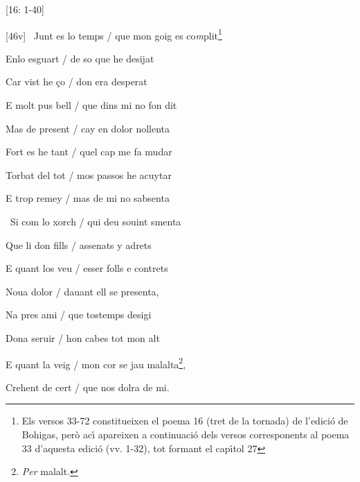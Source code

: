\documentclass[12pt]{article}
\begin{document}
\begin{estrofaBuida}


\end{estrofaBuida}


\begin{estrofaExtra}%




\begin{Versos}

[16: 1-40]

\end{Versos}


\end{estrofaExtra}


\begin{estrofa}

 [46v] \textparagraph\  Junt es lo temps / que mon goig es
co\textit{m}plit\footnote{Els versos 33-72 constitueixen el poema 16 (tret de la
tornada) de l'edici\'{o} de Bohigas, per\`{o} ac\'{\i} apareixen a
continuaci\'{o} dels versos corresponents al poema 33 d'aquesta edici\'{o} (vv.
1-32), tot formant el cap\'{\i}tol 27}

 Enlo esguart / de so que he desijat

 Car vist he \c{c}o / don era desperat

 E molt pus bell / que dins mi no fon dit

 Mas de present / cay en dolor nollenta

 Fort es he tant / quel cap me fa mudar

 Torbat del tot / mos passos he acuytar

 E trop remey / mas de mi no sabsenta

\end{estrofa}



\begin{estrofa}

 \textparagraph\  Si com lo xorch / qui deu souint smenta

 Que li don fills / assenats y adrets

 E quant los veu / esser folls e contrets

 Noua dolor / dauant ell se presenta,

 Na pres ami / que tostemps desigi

 Dona seruir / hon cabes tot mon alt

 E quant la veig / mon cor se jau malalta\footnote{\textit{Per} malalt.},

 Crehent de cert / que nos dolra de mi.

\end{estrofa}
\end{document}
